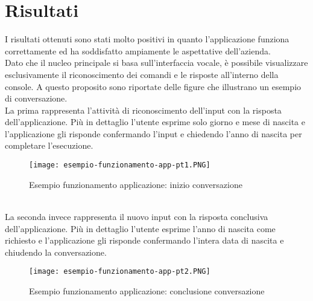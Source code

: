 \section{Risultati}
I risultati ottenuti sono stati molto positivi in quanto l'applicazione funziona correttamente ed ha soddisfatto ampiamente le aspettative dell'azienda. \\
Dato che il nucleo principale si basa sull'interfaccia vocale, è possibile visualizzare esclusivamente il riconoscimento dei comandi e le risposte all'interno della console. A questo proposito sono riportate delle figure che illustrano un esempio di conversazione. \\
La prima rappresenta l'attività di riconoscimento dell'input con la risposta dell'applicazione. Più in dettaglio l'utente esprime solo giorno e mese di nascita e l'applicazione gli risponde confermando l'input e chiedendo l'anno di nascita per completare l'esecuzione. \\
\begin{figure}[htbp]
	\begin{center}
		\texttt{[image: esempio-funzionamento-app-pt1.PNG]}
		\caption{Esempio funzionamento applicazione: inizio conversazione}
	\end{center}
\end{figure}
\\
La seconda invece rappresenta il nuovo input con la risposta conclusiva dell'applicazione. Più in dettaglio l'utente esprime l'anno di nascita come richiesto e l'applicazione gli risponde confermando l'intera data di nascita e chiudendo la conversazione. \\
\begin{figure}[htbp]
	\begin{center}
		\texttt{[image: esempio-funzionamento-app-pt2.PNG]}
		\caption{Esempio funzionamento applicazione: conclusione conversazione}
	\end{center}
\end{figure}
